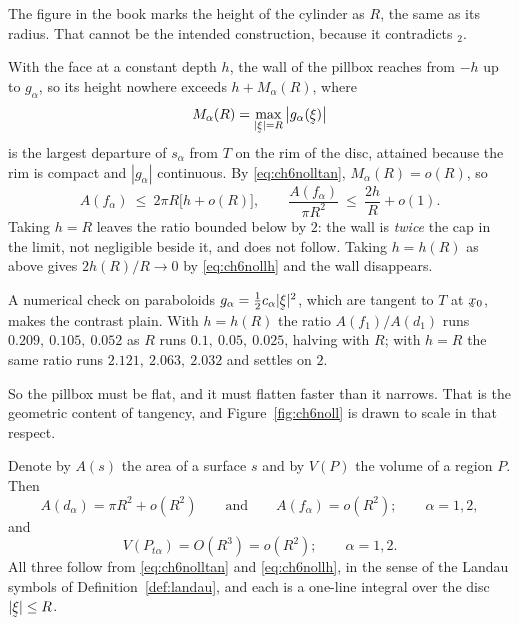 \begin{remark}\label{rem:ch6nolldepth}
The figure in the book marks the height of the cylinder as $R$, the
same as its radius. That cannot be the intended construction, because
it contradicts $_{2}$.

With the face at a constant depth $h$, the wall of the pillbox reaches
from $-h$ up to $g_{\alpha}$, so its height nowhere exceeds
$h+M_{\alpha}(R)$, where
\[
   M_{\alpha}(R)=\max_{|\vek{\xi}|=R}\big|g_{\alpha}(\vek{\xi})\big|
\]
is the largest departure of $s_{\alpha}$ from $T$ on the rim of the
disc, attained because the rim is compact and $|g_{\alpha}|$
continuous. By \eqref{eq:ch6nolltan}, $M_{\alpha}(R)=o(R)$, so
\[
   A(f_{\alpha})\ \le\ 2\pi R\big[h+o(R)\big],
   \qquad
   \frac{A(f_{\alpha})}{\pi R^{2}}\ \le\ \frac{2h}{R}+o(1) .
\]
Taking $h=R$ leaves the ratio bounded below by $2$: the wall is
\emph{twice} the cap in the limit, not negligible beside it, and
 does not follow. Taking $h=h(R)$ as above gives
$2h(R)/R\to0$ by \eqref{eq:ch6nollh} and the wall disappears.

A numerical check on paraboloids $g_{\alpha}=\tfrac12c_{\alpha}
|\vek{\xi}|^{2}$, which are tangent to $T$ at $\bx_{0}$, makes the
contrast plain. With $h=h(R)$ the ratio $A(f_{1})/A(d_{1})$ runs
$0.209,\ 0.105,\ 0.052$ as $R$ runs $0.1,\ 0.05,\ 0.025$, halving with
$R$; with $h=R$ the same ratio runs $2.121,\ 2.063,\ 2.032$ and settles
on $2$.

So the pillbox must be flat, and it must flatten faster than it
narrows. That is the geometric content of tangency, and
Figure~\ref{fig:ch6noll} is drawn to scale in that respect.
\end{remark}

Denote by $A(s)$ the area of a surface $s$ and by $V(P)$ the volume of
a region $P$. Then
\begin{equation}
   A(d_{\alpha})=\pi R^{2}+o(R^{2})
   \qquad\text{and}\qquad
   A(f_{\alpha})=o(R^{2});\qquad\alpha=1,2 ,
   \tag{6.86}\label{eq:6.86}
\end{equation}
and
\begin{equation}
   V(P_{t\alpha})=O(R^{3})=o(R^{2});\qquad\alpha=1,2 .
   \tag{6.87}\label{eq:6.87}
\end{equation}
All three follow from \eqref{eq:ch6nolltan} and
\eqref{eq:ch6nollh}, in the sense of the Landau symbols of
Definition~\ref{def:landau}, and each is a one-line integral over the
disc $|\vek{\xi}|\le R$.

